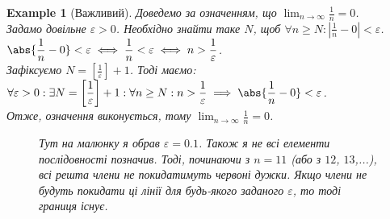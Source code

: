 \documentclass[a4paper, 14pt]{article}
\theoremstyle{theoremdd}
\theoremstyle{theoremdd}
\theoremstyle{theoremdd}
\theoremstyle{theoremdd}
\newtheorem{example}[theorem]{Example}
\theoremstyle{theoremdd}
\theoremstyle{theoremdd}
\theoremstyle{theoremdd}
\theoremstyle{theoremdd}
\begin{document}
	\begin{example}[Важливий] 
	\label{one_over_n_converges_to_zero}
	Доведемо за означенням, що $\displaystyle\lim_{n \to \infty} \frac{1}{n} = 0$.\\
	Задамо довільне $\varepsilon > 0$. Необхідно знайти таке $N$, щоб $\displaystyle  \forall n \geq N: \left|\frac{1}{n}-0 \right|<\varepsilon$.\\
	$\displaystyle \abs{\frac{1}{n} - 0} < \varepsilon \iff \displaystyle \frac{1}{n}<\varepsilon \iff n > \frac{1}{\varepsilon}$.\\
	Зафіксуємо $\displaystyle N = \left[\frac{1}{\varepsilon} \right] + 1$. Тоді маємо: $\forall \varepsilon > 0: \exists N = \displaystyle \left[\frac{1}{\varepsilon} \right] + 1: \forall n \geq N: n > \frac{1}{\varepsilon} \implies \abs{\frac{1}{n} - 0} < \varepsilon$.\\
	Отже, означення виконується, тому $\displaystyle\lim_{n \to \infty} \frac{1}{n} = 0$.
	\begin{figure}[H]
	\centering
	\resizebox{0.8\textwidth}{!} {
}
	\caption*{Тут на малюнку я обрав $\varepsilon = 0.1$. Також я не всі елементи послідовності позначив. Тоді, починаючи з $n=11$ (або з $12$, $13$,...), всі решта члени не покидатимуть червоні дужки. Якщо члени не будуть покидати ці лінії для будь-якого заданого $\varepsilon$, то тоді границя існує.}
	\end{figure}
	\end{example}
\end{document}
